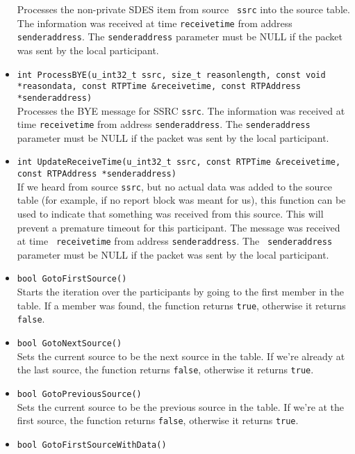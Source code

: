 \documentclass[12pt,a4paper]{article}
\begin{document}
\begin{itemize}
						Processes the non-private SDES item from source {\tt
						ssrc} into the source table. The information was
						received at time {\tt receivetime} from address {\tt
						senderaddress}. The {\tt senderaddress} parameter must
						be NULL if the packet was sent by the local participant.
					\item {\tt int ProcessBYE(u\_int32\_t ssrc, size\_t reasonlength, const void *reasondata, const RTPTime \&receivetime,
					                          const RTPAddress *senderaddress)}\\
						Processes the BYE message for SSRC {\tt ssrc}. The
						information was received at time {\tt receivetime} from
						address {\tt senderaddress}. The {\tt senderaddress}
						parameter must be NULL if the packet was sent by the
						local participant.
					\item {\tt int UpdateReceiveTime(u\_int32\_t ssrc, const RTPTime \&receivetime, const RTPAddress *senderaddress)}\\
						If we heard from source {\tt ssrc}, but no actual
						data was added to the source table (for example, if
						no report block was meant for us), this function can
						be used to indicate that something was received from
						this source. This will prevent a premature timeout for
						this participant. The message was received at time {\tt
						receivetime} from address {\tt senderaddress}. The {\tt
						senderaddress} parameter must be NULL if the packet was
						sent by the local participant.
					\item {\tt bool GotoFirstSource()}\\
						Starts the iteration over the participants by going to the
						first member in the table. If a member was found, the function
						returns {\tt true}, otherwise it returns {\tt false}.
					\item {\tt bool GotoNextSource()}\\
						Sets the current source to be the next source in the table.
						If we're already at the last source, the function returns
						{\tt false}, otherwise it returns {\tt true}.
					\item {\tt bool GotoPreviousSource()}\\
						Sets the current source to be the previous source in the table.
						If we're at the first source, the function returns
						{\tt false}, otherwise it returns {\tt true}.
					\item {\tt bool GotoFirstSourceWithData()}\\

\end{itemize}
\end{document}
